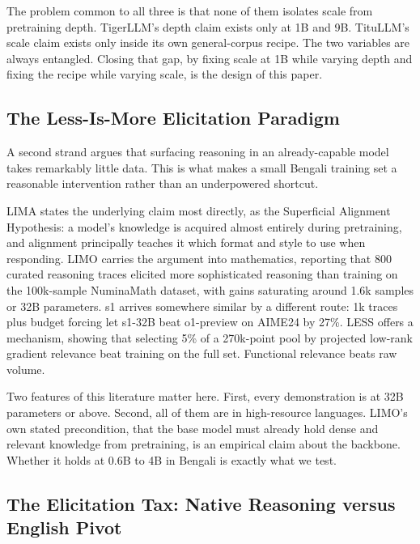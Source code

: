 \documentclass[10pt,twocolumn,letterpaper]{article}
\begin{document}
The problem common to all three is that none of them isolates scale from
pretraining depth. TigerLLM's depth claim exists only at 1B and 9B. TituLLM's
scale claim exists only inside its own general-corpus recipe. The two variables
are always entangled. Closing that gap, by fixing scale at 1B while varying
depth and fixing the recipe while varying scale, is the design of this paper.

\subsection{The Less-Is-More Elicitation Paradigm}

A second strand argues that surfacing reasoning in an already-capable model
takes remarkably little data. This is what makes a small Bengali training set a
reasonable intervention rather than an underpowered shortcut.

LIMA \parencite{zhou2023lima} %
states the underlying claim most directly, as the Superficial Alignment
Hypothesis: a model's knowledge is acquired almost entirely during pretraining,
and alignment principally teaches it which format and style to use when
responding. LIMO \parencite{ye2025limo} carries the argument into mathematics,
reporting that 800 curated reasoning traces elicited more sophisticated
reasoning than training on the 100k-sample NuminaMath dataset, with gains
saturating around 1.6k samples or 32B parameters. s1
\parencite{muennighoff2025s1} arrives somewhere similar by a different route:
1k traces plus budget forcing let s1-32B beat o1-preview on AIME24 by 27\%. LESS
\parencite{xia2024less} offers a mechanism, showing that selecting 5\% of a
270k-point pool by projected low-rank gradient relevance beat training on the
full set. Functional relevance beats raw volume.

Two features of this literature matter here. First, every demonstration is at
32B parameters or above. Second, all of them are in high-resource languages.
LIMO's own stated precondition, that the base model must already hold dense and
relevant knowledge from pretraining, is an empirical claim about the backbone.
Whether it holds at 0.6B to 4B in Bengali is exactly what we test.

\subsection{The Elicitation Tax: Native Reasoning versus English Pivot}
\end{document}

